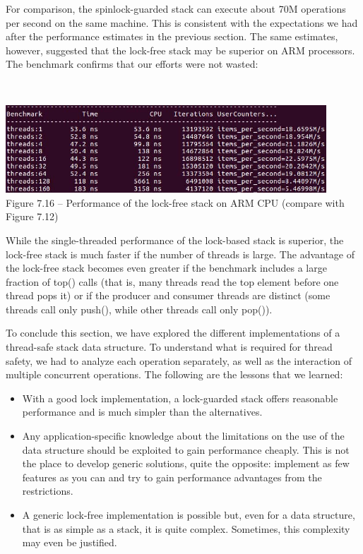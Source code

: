 For comparison, the spinlock-guarded stack can execute about 70M operations per second on the same machine. This is consistent with the expectations we had after the performance estimates in the previous section. The same estimates, however, suggested that the lock-free stack may be superior on ARM processors. The benchmark confirms that our efforts were not wasted:

\hspace*{\fill} \\ %
\begin{center}
\includegraphics[width=0.9\textwidth]{content/2/chapter7/images/16.jpg}\\ 
Figure 7.16 – Performance of the lock-free stack on ARM CPU (compare with Figure 7.12)
\end{center}

While the single-threaded performance of the lock-based stack is superior, the lock-free stack is much faster if the number of threads is large. The advantage of the lock-free stack becomes even greater if the benchmark includes a large fraction of top() calls (that is, many threads read the top element before one thread pops it) or if the producer and consumer threads are distinct (some threads call only push(), while other threads call only pop()).

To conclude this section, we have explored the different implementations of a thread-safe stack data structure. To understand what is required for thread safety, we had to analyze each operation separately, as well as the interaction of multiple concurrent operations. The following are the lessons that we learned:

\begin{itemize}
\item 
With a good lock implementation, a lock-guarded stack offers reasonable performance and is much simpler than the alternatives.

\item 
Any application-specific knowledge about the limitations on the use of the data structure should be exploited to gain performance cheaply. This is not the place to develop generic solutions, quite the opposite: implement as few features as you can and try to gain performance advantages from the restrictions.

\item 
A generic lock-free implementation is possible but, even for a data structure, that is as simple as a stack, it is quite complex. Sometimes, this complexity may even be justified.

\end{itemize}

